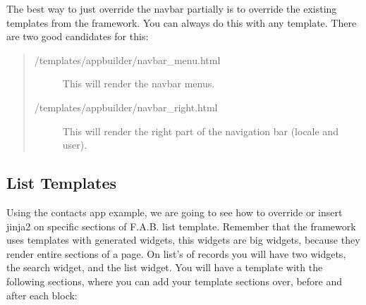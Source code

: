 \documentclass[letterpaper,10pt,english]{sphinxmanual}
\begin{document}
The best way to just override the navbar partially is to override the existing templates
from the framework. You can always do this with any template. There are two good candidates for this:
\begin{quote}\begin{description}
\item[{/templates/appbuilder/navbar\_menu.html}] \leavevmode
This will render the navbar menus.

\item[{/templates/appbuilder/navbar\_right.html}] \leavevmode
This will render the right part of the navigation bar (locale and user).

\end{description}\end{quote}


\subsection{List Templates}
\label{templates:list-templates}
Using the contacts app example, we are going to see how to override or insert jinja2 on specific sections
of F.A.B. list template. Remember that the framework uses templates with generated widgets, this widgets are big
widgets, because they render entire sections of a page.
On list's of records you will have two widgets, the search widget, and the list widget. You will have
a template with the following sections, where you can add your template sections over, before and after
each block:
\end{document}
